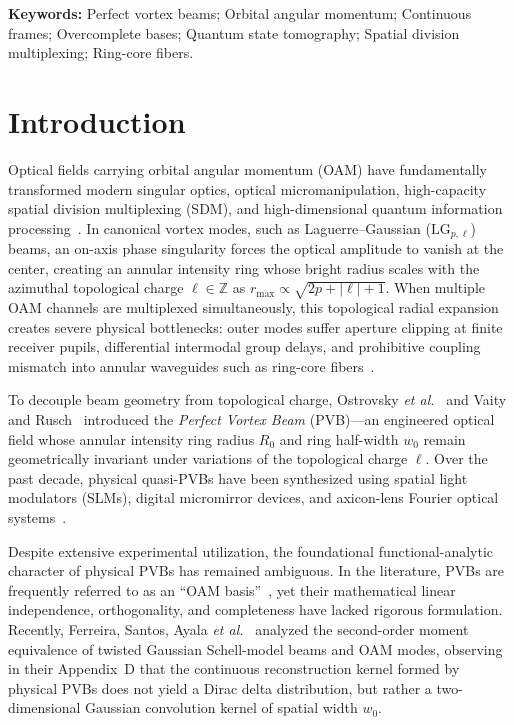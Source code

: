 \documentclass[11pt,a4paper]{article}
\begin{document}
\vspace{0.5em}
\noindent\textbf{Keywords:} Perfect vortex beams; Orbital angular momentum; Continuous frames; Overcomplete bases; Quantum state tomography; Spatial division multiplexing; Ring-core fibers.

\section{Introduction}
\label{sec:intro}

Optical fields carrying orbital angular momentum (OAM) have fundamentally transformed modern singular optics, optical micromanipulation, high-capacity spatial division multiplexing (SDM), and high-dimensional quantum information processing~\cite{Allen1992,Durnin1987,Mair2001,Dennis2009,FrankeArnold2008,Berry1998,Berry2004,Barnett2002,Padgett1999,Gbur2016,MandelWolf1995,Siegman1986}. In canonical vortex modes, such as Laguerre--Gaussian ($\text{LG}_{p, \ell}$) beams, an on-axis phase singularity forces the optical amplitude to vanish at the center, creating an annular intensity ring whose bright radius scales with the azimuthal topological charge $\ell \in \mathbb{Z}$ as $r_{\max} \propto \sqrt{2p + |\ell| + 1}$. When multiple OAM channels are multiplexed simultaneously, this topological radial expansion creates severe physical bottlenecks: outer modes suffer aperture clipping at finite receiver pupils, differential intermodal group delays, and prohibitive coupling mismatch into annular waveguides such as ring-core fibers~\cite{Villalba2023,RojasRojas2021,Canas2021,Ramachandran2009,Bozinovic2013,Willner2015,Brunet2014,Gregg2015,Zhu2018,Wang2012}.

To decouple beam geometry from topological charge, Ostrovsky \emph{et al.}~\cite{Ostrovsky2013} and Vaity and Rusch~\cite{Vaity2015} introduced the \emph{Perfect Vortex Beam} (PVB)---an engineered optical field whose annular intensity ring radius $R_0$ and ring half-width $w_0$ remain geometrically invariant under variations of the topological charge $\ell$. Over the past decade, physical quasi-PVBs have been synthesized using spatial light modulators (SLMs), digital micromirror devices, and axicon-lens Fourier optical systems~\cite{Chen2013,Reddy2016,Jabir2016,GarciaGarcia2014,Li2018PVB,PerezGarcia2017}.

Despite extensive experimental utilization, the foundational functional-analytic character of physical PVBs has remained ambiguous. In the literature, PVBs are frequently referred to as an ``OAM basis''~\cite{GarciaEscartin2008}, yet their mathematical linear independence, orthogonality, and completeness have lacked rigorous formulation. Recently, Ferreira, Santos, Ayala \emph{et al.}~\cite{Ferreira2026} analyzed the second-order moment equivalence of twisted Gaussian Schell-model beams and OAM modes, observing in their Appendix~D that the continuous reconstruction kernel formed by physical PVBs does not yield a Dirac delta distribution, but rather a two-dimensional Gaussian convolution kernel of spatial width $w_0$.
\end{document}
